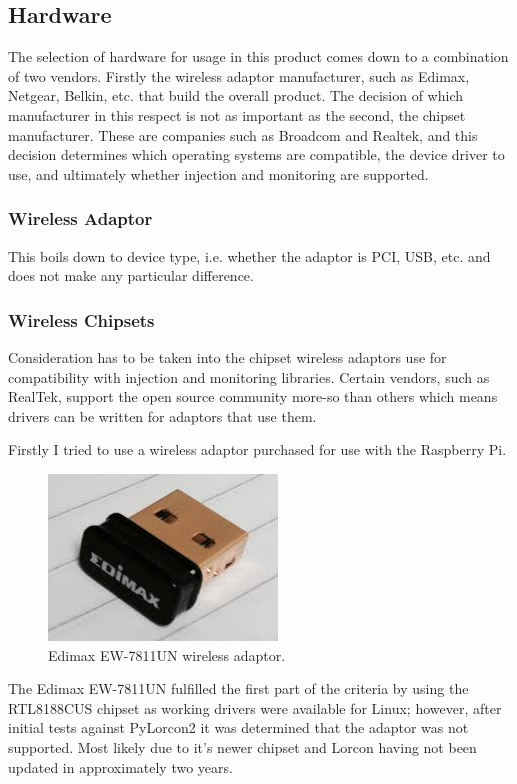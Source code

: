 \subsection{Hardware}
The selection of hardware for usage in this product comes down to a combination of two vendors. Firstly the wireless adaptor manufacturer, such as Edimax, Netgear, Belkin, etc. that build the overall product. The decision of which manufacturer in this respect is not as important as the second, the chipset manufacturer.  These are companies such as Broadcom and Realtek, and this decision determines which operating systems are compatible, the device driver to use, and ultimately whether injection and monitoring are supported.

\subsubsection{Wireless Adaptor}
This boils down to device type, i.e. whether the adaptor is PCI, USB, etc. and does not make any particular difference.
\subsubsection{Wireless Chipsets}
Consideration has to be taken into the chipset wireless adaptors use for compatibility with injection and monitoring libraries. Certain vendors, such as RealTek, support the open source community more-so than others which means drivers can be written for adaptors that use them.

Firstly I tried to use a wireless adaptor purchased for use with the Raspberry Pi. 

\begin{figure}[h!]
\centering\includegraphics{research/figures/edimax.png}
\caption{Edimax EW-7811UN wireless adaptor.}
\end{figure}

The Edimax EW-7811UN fulfilled the first part of the criteria by using the RTL8188CUS chipset as working drivers were available for Linux; however, after initial tests against PyLorcon2 it was determined that the adaptor was not supported. Most likely due to it's newer chipset and Lorcon having not been updated in approximately two years. 

